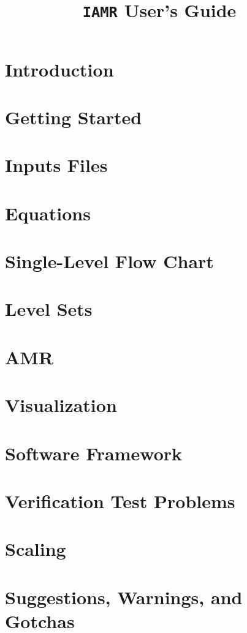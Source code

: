 \documentclass[11pt]{book}
\title{{\tt IAMR} User's Guide}
\begin{document}
\maketitle
\tableofcontents

\chapter{Introduction}


\chapter{Getting Started}


\chapter{Inputs Files}


\chapter{Equations}


\chapter{Single-Level Flow Chart}


\chapter{Level Sets}\label{Chap:Level Sets}


\chapter{AMR}


\chapter{Visualization}


\chapter{Software Framework}


\chapter{Verification Test Problems}


\chapter{Scaling}


\chapter{Suggestions, Warnings, and Gotchas}


\renewcommand\bibname{References}


\end{document}

